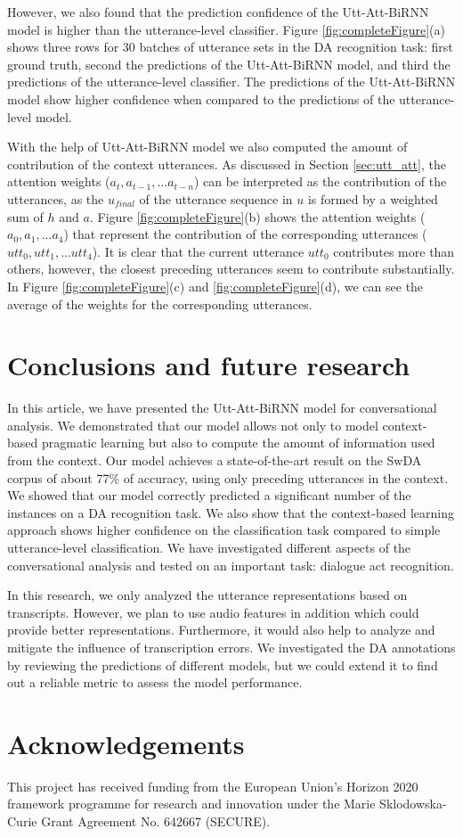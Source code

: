 \documentclass[a4paper]{article}
\begin{document}
However, we also found that the prediction confidence of the Utt-Att-BiRNN model is higher than the utterance-level classifier. Figure \ref{fig:completeFigure}(a) shows three rows for 30 batches of utterance sets in the DA recognition task: first ground truth, second the predictions of the Utt-Att-BiRNN model, and third the predictions of the utterance-level classifier.
The predictions of the Utt-Att-BiRNN model show higher confidence when compared to the predictions of the utterance-level model.


With the help of Utt-Att-BiRNN model we also computed the amount of contribution of the context utterances.
As discussed in Section \ref{sec:utt_att}, the attention weights ($a_{t}, a_{t-1},...a_{t-n}$) can be interpreted as the contribution of the utterances, as the $u_{final}$ of the utterance sequence in $u$ is formed by a weighted sum of $h$ and $a$.
Figure \ref{fig:completeFigure}(b) shows the attention weights ($a_{0}, a_{1},...a_{4}$) that represent the contribution of the corresponding utterances ($utt_{0}, utt_{1},...utt_{4}$).
It is clear that the current utterance $utt_{0}$ contributes more than others, however, the closest preceding utterances seem to contribute substantially.
In Figure \ref{fig:completeFigure}(c) and \ref{fig:completeFigure}(d), we can see the average of the weights for the corresponding utterances.


\section{Conclusions and future research}

In this article, we have presented the Utt-Att-BiRNN model for conversational analysis.
We demonstrated that our model allows not only to model context-based pragmatic learning but also to compute the amount of information used from the context. 
Our model achieves a state-of-the-art result on the SwDA corpus of about 77\% of accuracy, using only preceding utterances in the context.
We showed that our model correctly predicted a significant number of the instances on a DA recognition task. 
We also show that the context-based learning approach shows higher confidence on the classification task compared to simple utterance-level classification.
We have investigated different aspects of the conversational analysis and tested on an important task: dialogue act recognition.

In this research, we only analyzed the utterance representations based on transcripts. 
However, we plan to use audio features in addition which could provide better representations.
Furthermore, it would also help to analyze and mitigate the influence of transcription errors.
We investigated the DA annotations by reviewing the predictions of different models, but we could extend it to find out a reliable metric to assess the model performance.
\balance

\section{Acknowledgements}

This project has received funding from the European Union's Horizon 2020 framework programme for research and innovation under the Marie Sklodowska-Curie Grant Agreement No. 642667 (SECURE).



\end{document}

